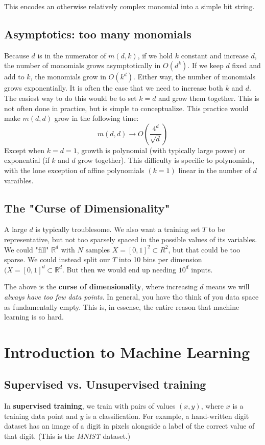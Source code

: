 \documentclass[titlepage, 12pt, leqno]{article}
\begin{document}
This encodes an otherwise relatively complex monomial into a simple bit string.

\subsection{Asymptotics: too many monomials}
Because $d$ is in the numerator of $m(d,k)$, if we hold $k$ constant and increase
$d$, the number of monomials grows asymptotically in $O(d^{k})$. If we keep $d$
fixed and add to $k$, the monomials grow in $O(k^{d})$. Either way, the number of
monomials grows exponentially. It is often the case that we need to increase both
$k$ and $d$. The easiest way to do this would be to set $k=d$ and grow them
together. This is not often done in practice, but is simple to conceptualize. This
practice would make $m(d,d)$ grow in the following time:
\[
    m(d,d) \rightarrow O\left(\frac{4^{d}}{\sqrt{d}}\right)
\]
Except when $k=d=1$, growth is polynomial (with typically large power) or
exponential (if $k$ and $d$ grow together). This difficulty is specific to
polynomials, with the lone exception of affine polynomials $(k=1)$ linear in the
number of $d$ varaibles.

\subsection{The "Curse of Dimensionality"}
A large $d$ is typically troublesome. We also want a training set $T$ to be
representative, but not too sparsely spaced in the possible values of its
variables. We could "fill" $ \mathbb{R}^{d}$ with $N$ samples $X = [0,1]^{2}
\subset R^{2}$, but that could be too sparse. We could instead split our $T$ into
10 bins per dimension $(X = [0,1]^{d} \subset \mathbb{R}^{d}$. But then we would
end up needing $10^{d}$ inputs. 

\begin{definition}
    The above is the \textbf{curse of dimensionality}, where increasing $d$ 
    means we will \textit{always have too few data points}. In general, you have
    tho think of you data space as fundamentally empty. This is, in
    essense, the entire reason that machine learning is so hard.
\end{definition}

\pagebreak
\section{Introduction to Machine Learning}
\subsection{Supervised vs. Unsupervised training}
\begin{definition}
    In \textbf{supervised training}, we train with pairs of values $(x,y)$, where
    $x$ is a training data point and $y$ is a classification. For example, a
    hand-written digit dataset has an image of a digit in pixels alongside a 
    label of the correct value of that digit. (This is the \textit{MNIST} 
    dataset.)
\end{definition}
\end{document}
